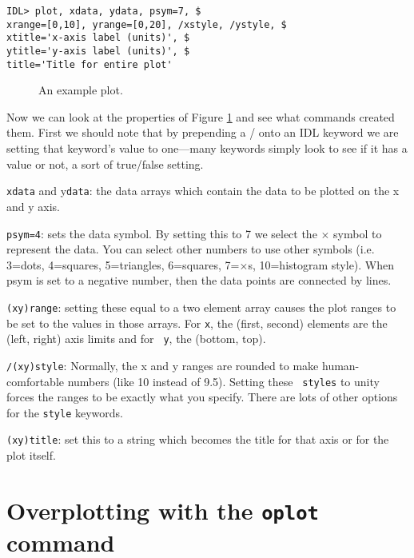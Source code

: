 \documentclass[preprint]{aastex}
\begin{document}
\begin{verbatim}
IDL> plot, xdata, ydata, psym=7, $
xrange=[0,10], yrange=[0,20], /xstyle, /ystyle, $
xtitle='x-axis label (units)', $
ytitle='y-axis label (units)', $
title='Title for entire plot'
\end{verbatim}

\begin{figure}[!ht]
\begin{center}
\vspace{-0.4in}\end{center}

\caption{An example plot.}\label{exampleplot1}
\end{figure}

	Now we can look at the properties of Figure   \ref{exampleplot1}
and see what commands created them.  First we should note that by
prepending a / onto an IDL keyword we are setting that keyword's value
to one---many keywords simply look to see if it has a value or not, a
sort of true/false setting. 

{\tt xdata} and y{\tt data}:  the data arrays which contain the data to be
plotted on the x and y axis. 

{\tt psym=4}:  sets the data symbol.  By setting this to 7 we select the
$\times$ symbol to represent the data.  You can select other numbers to use other
symbols (i.e.  3=dots, 4=squares, 5=triangles, 6=squares, 7=$\times$s,
10=histogram style).  When psym is set to a negative number, then
the data points are connected by lines. 

{\tt (xy)range}: setting these equal to a two element array causes the
plot ranges to be set to the values in those arrays.  For {\tt x}, the
(first, second) elements are the (left, right) axis limits and for {\tt
y}, the (bottom, top).

{\tt /(xy)style}: Normally, the x and y ranges are rounded to make
human-comfortable numbers (like 10 instead of 9.5).  Setting these {\tt
styles} to unity forces the ranges to be exactly what you specify. There
are lots of other options for the {\tt style} keywords.  

{\tt (xy)title}: set this to a string which becomes the title for that
axis or for the plot itself. 

\section{Overplotting with the {\tt oplot} command}\label{oplot}
\end{document}

